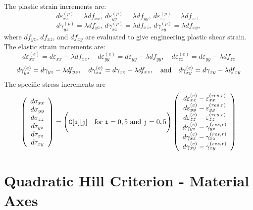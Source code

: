 \documentclass[11pt]{book}
\def\code#1{{\small\tt #1}}
\def\err#1{\varepsilon_{#1}^{(res,r)}}
\def\fvvec#1#2#3#4#5#6{\left(\begin{array}{ccc} #1 \\ #2 \\ #3 \\ #4 \\ #5 \\ #6 \end{array}\right)}
\def\g#1{\gamma_{#1}}
\def\s#1{\sigma_{#1}}
\def\t#1{\tau_{#1}}
\begin{document}
 The plastic strain increments are:
\begin{equation}
       d\varepsilon_{xx}^{(p)} = \lambda df_{xx}, \ 
       d\varepsilon_{yy}^{(p)} = \lambda df_{yy}, \ 
       d\varepsilon_{zz}^{(p)} = \lambda df_{zz}, \ 
\end{equation}
\begin{equation}
       d\gamma_{yz}^{(p)} =  \lambda df_{yz}, \ 
       d\gamma_{xz}^{(p)} =  \lambda df_{xz}, \ 
       d\gamma_{xy}^{(p)} =  \lambda df_{xy},
\end{equation}
where $df_{yz}$, $df_{xz}$, and $df_{xy}$ are evaluated to give engineering plastic shear strain. The elastic strain increments are:
\begin{equation}
       d\varepsilon_{xx}^{(e)} = d\varepsilon_{xx} -\lambda df_{xx}, \quad
       d\varepsilon_{yy}^{(e)} = d\varepsilon_{yy} -\lambda df_{yy}, \quad
       d\varepsilon_{zz}^{(e)} =  d\varepsilon_{yy} -\lambda df_{zz}
\end{equation}
\begin{equation}
       d\gamma_{yz}^{(e)} = d\gamma_{yz} -  \lambda df_{yz}, \quad 
       d\gamma_{xz}^{(e)} = d\gamma_{xz} -  \lambda df_{xz}, \quad  {\rm and} \quad
       d\gamma_{xy}^{(e)} = d\gamma_{xy} -  \lambda df_{xy}
\end{equation}
The specific stress increments are
\begin{equation}
      \fvvec{d\s{xx}}{d\s{yy}}{d\s{zz}}{d\t{yz}}{d\t{xz}}{d\t{xy}} = \Biggl(\code{C[i][j]} \quad {\rm for\ }\code{i}=0,5\ {\rm and\ }\code{j}=0,5\Biggr)
          \fvvec{d\varepsilon_{xx}^{(e)}  - \err{xx}}{d\varepsilon_{yy}^{(e)}  -\err{yy}}{d\varepsilon_{zz}^{(e)}  -\err{zz}}
                             {d\g{yz}^{(e)}-\gamma_{yz}^{(res,r)}}{d\g{xz}^{(e)}-\gamma_{xz}^{(res,r)}}{d\g{xy}^{(e)}-\gamma_{xy}^{(res,r)}}
 \end{equation}

\section{Quadratic Hill Criterion - Material Axes}
\end{document}
